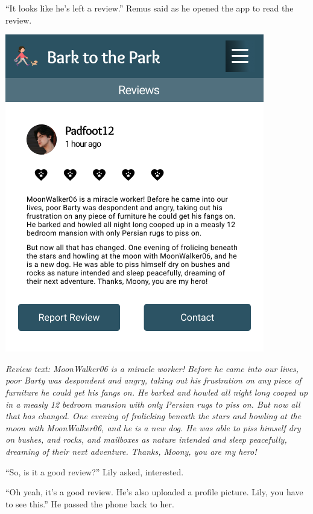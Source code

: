 \documentclass[12pt,twoside,openright]{memoir}
\begin{document}
``It looks like he's left a review.'' Remus said as he opened the app to read the review.

\bigskip

{\centering\includegraphics[width=\textwidth]{Review RegularFont}}
 

\textit{Review text: MoonWalker06 is a miracle worker! Before he came into our lives, poor Barty was despondent and angry, taking out his frustration on any piece of furniture he could get his fangs on. He barked and howled all night long cooped up in a measly 12 bedroom mansion with only Persian rugs to piss on. But now all that has changed. One evening of frolicking beneath the stars and howling at the moon with MoonWalker06, and he is a new dog. He was able to piss himself dry on bushes, and rocks, and mailboxes as nature intended and sleep peacefully, dreaming of their next adventure. Thanks, Moony, you are my hero! }

``So, is it a good review?'' Lily asked, interested.

``Oh yeah, it's a good review. He's also uploaded a profile picture. Lily, you have to see this.'' He passed the phone back to her.
\end{document}

